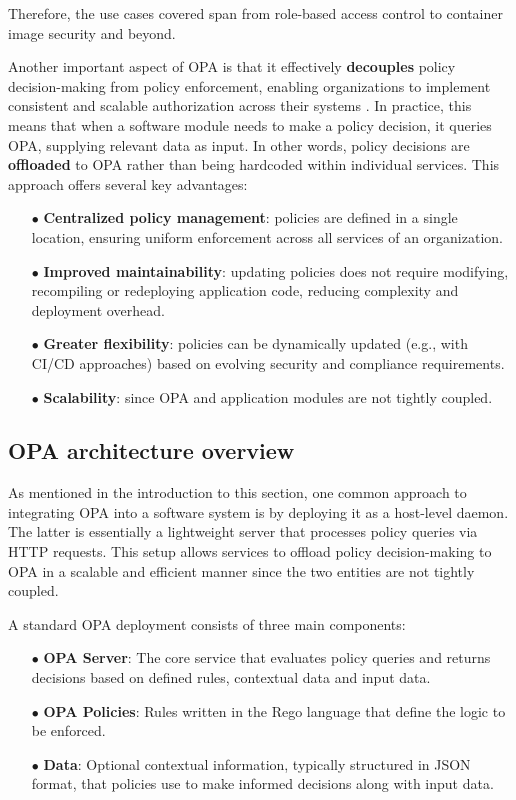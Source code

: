 Therefore, the use cases covered span from role-based access control to container image security and beyond.
\newline


Another important aspect of OPA is that it effectively \textbf{decouples} policy decision-making from policy enforcement, enabling organizations to implement consistent and scalable authorization across their systems \cite{test}.
In practice, this means that when a software module needs to make a policy decision, it queries OPA, supplying relevant data as input. In other words, policy decisions are \textbf{offloaded} to OPA rather than being hardcoded within individual services. This approach offers several key advantages:
\begin{itemize}[itemsep=0.2pt, topsep=1pt]
  \item[$\bullet$] \textbf{Centralized policy management}: policies are defined in a single location, ensuring uniform enforcement across all services of an organization.
  \item[$\bullet$] \textbf{Improved maintainability}: updating policies does not require modifying, recompiling or redeploying application code, reducing complexity and deployment overhead.
  \item[$\bullet$] \textbf{Greater flexibility}: policies can be dynamically updated (e.g., with CI/CD approaches) based on evolving security and compliance requirements. 
  \item[$\bullet$] \textbf{Scalability}: since OPA and application modules are not tightly coupled.
\end{itemize} 

\subsection{OPA architecture overview}

As mentioned in the introduction to this section, one common approach to integrating OPA into a software system is by deploying it as a host-level daemon. The latter is essentially a lightweight server that processes policy queries via HTTP requests. This setup allows services to offload policy decision-making to OPA in a scalable and efficient manner since the two entities are not tightly coupled.

A standard OPA deployment consists of three main components:

\begin{itemize}[itemsep=0.2pt, topsep=1pt]
\item[$\bullet$] \textbf{OPA Server}: The core service that evaluates policy queries and returns decisions based on defined rules, contextual data and input data.
\item[$\bullet$] \textbf{OPA Policies}: Rules written in the Rego language that define the logic to be enforced.
\item[$\bullet$] \textbf{Data}: Optional contextual information, typically structured in JSON format, that policies use to make informed decisions along with input data.
\end{itemize}

